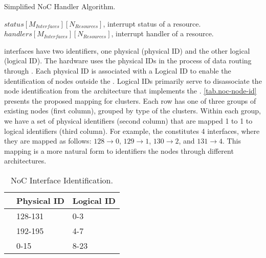 			\begin{algorithm}[!tb]
				\caption{Simplified NoC Handler Algorithm.}%
				\label{alg.noc-handler}%
				\begin{algorithmic}[1]
					\Require $status[M_{Interfaces}][N_{Resources}]$, interrupt status of a resource.
					\Require $handlers[M_{Interfaces}][N_{Resources}]$, interrupt handler of a resource.
							\EndIf
						\EndFor
					\EndFor
					\EndProcedure
				\end{algorithmic}%
			\end{algorithm}

			\noc interfaces have two identifiers, one physical (physical ID) and the
			other logical (logical ID). The hardware uses the physical IDs in the
			process of data routing through \noc. Each physical ID is associated with
			a Logical ID to enable the identification of \noc nodes outside the \hal.
			Logical IDs primarily serve to disassociate the node identification from
			the architecture that implements the \hal. \autoref{tab.noc-node-id}
			presents the proposed mapping for \mppa clusters. Each row has one of
			three groups of existing \noc nodes (first column), grouped by type of
			the clusters. Within each group, we have a set of physical identifiers
			(second column) that are mapped 1 to 1 to logical identifiers (third column).
			For example, the  constitutes 4 \noc interfaces, where they are
			mapped as follows: $128 \to 0$, $129 \to 1$, $130 \to 2$, and $131 \to 4$.
			This mapping is a more natural form to identifiers the \noc nodes through
			different architectures.

			\begin{table}[!tb]
				\centering%
				\caption{NoC Interface Identification.}%
				\label{tab.noc-node-id}%

				\begin{tabular}{l|l|l|}
					\cline{2-3}
															   & \textbf{Physical ID} & \textbf{Logical ID} \\ \hline
					\multicolumn{1}{|l|}{\textbf{\iocluster0}} & 128-131              & 0-3                 \\ \hline
					\multicolumn{1}{|l|}{\textbf{\iocluster1}} & 192-195              & 4-7                 \\ \hline
					\multicolumn{1}{|l|}{\textbf{\cclusters}}  & 0-15                 & 8-23                \\ \hline
				\end{tabular}

			\end{table}

